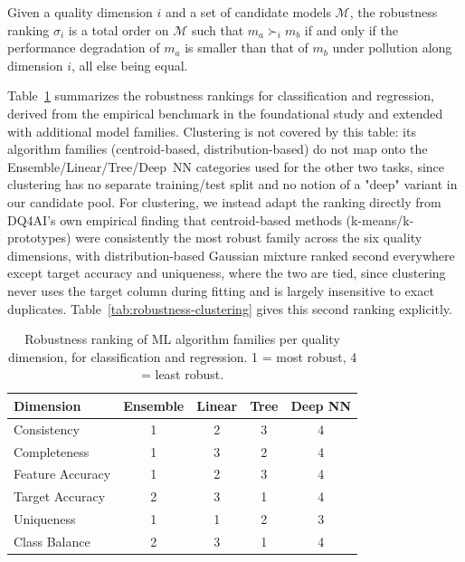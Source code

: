 \documentclass[runningheads]{llncs}
\begin{document}
\begin{definition}
Given a quality dimension $i$ and a set of candidate models
$\mathcal{M}$, the robustness ranking $\sigma_i$ is a total
order on $\mathcal{M}$ such that $m_a \succ_i m_b$ if and only
if the performance degradation of $m_a$ is smaller than that of
$m_b$ under pollution along dimension $i$, all else being equal.
\end{definition}

Table~\ref{tab:robustness} summarizes the robustness rankings
for classification and regression, derived from the empirical
benchmark in the foundational study and extended with additional
model families.
Clustering is not covered by this table: its algorithm families
(centroid-based, distribution-based) do not map onto the
Ensemble/Linear/Tree/Deep~NN categories used for the other two
tasks, since clustering has no separate training/test split and
no notion of a "deep" variant in our candidate pool.
For clustering, we instead adapt the ranking directly from
DQ4AI's own empirical finding that centroid-based methods
(k-means/k-prototypes) were consistently the most robust family
across the six quality dimensions, with distribution-based
Gaussian mixture ranked second everywhere except target accuracy
and uniqueness, where the two are tied, since clustering never
uses the target column during fitting and is largely insensitive
to exact duplicates.
Table~\ref{tab:robustness-clustering} gives this second ranking
explicitly.

\begin{table}[t]
\centering
\caption{Robustness ranking of ML algorithm families per quality
dimension, for classification and regression.
1 = most robust, 4 = least robust.}
\label{tab:robustness}
\small
\begin{tabular}{@{}lcccc@{}}
\toprule
\textbf{Dimension} & \textbf{Ensemble} & \textbf{Linear} & \textbf{Tree} & \textbf{Deep NN} \\
\midrule
Consistency        & 1 & 2 & 3 & 4 \\
Completeness       & 1 & 3 & 2 & 4 \\
Feature Accuracy   & 1 & 2 & 3 & 4 \\
Target Accuracy    & 2 & 3 & 1 & 4 \\
Uniqueness         & 1 & 1 & 2 & 3 \\
Class Balance      & 2 & 3 & 1 & 4 \\
\bottomrule
\end{tabular}
\end{table}
\end{document}
